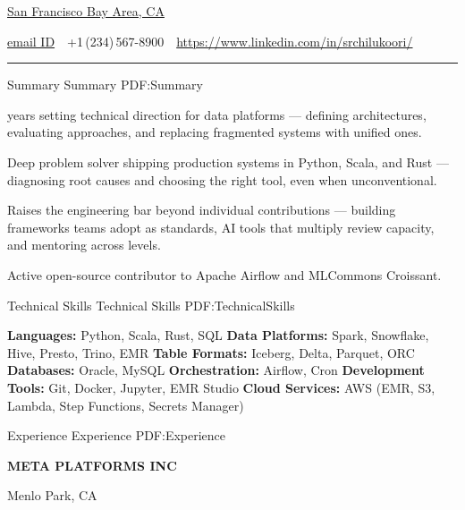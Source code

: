 \documentclass[letterpaper,MMMyyyy,nonstopmode]{simpleresumecv}
\newcommand{\CVAuthor}{Sadha Chilukoori}
\newcommand{\CVWebpage}{https://www.linkedin.com/in/srchilukoori/}
\newcommand{\CompanyName}[1]{{\fontsize{10pt}{12pt}\selectfont\bfseries\MakeUppercase{#1}}}
\begin{document}

\Title{\CVAuthor}

\begin{SubTitle}
\href{https://www.google.com/maps/place/San+Francisco+Bay+Area,+CA/}
{San Francisco Bay Area, CA}
\par
\href{mailto:<email ID>}
{email ID}
\,\SubBulletSymbol\,
+1\,(234)\,567-8900
\,\SubBulletSymbol\,
\href{\CVWebpage}
{\url{\CVWebpage}}
\end{SubTitle}

\Gap
\hrule
\BigGap

\begin{Body}

\Section
{Summary}
{Summary}
{PDF:Summary}

\begingroup

 years setting technical direction for data platforms --- defining architectures, evaluating approaches, and replacing fragmented systems with unified ones.

\Entry Deep problem solver shipping production systems in Python, Scala, and Rust --- diagnosing root causes and choosing the right tool, even when unconventional.

\Entry Raises the engineering bar beyond individual contributions --- building frameworks teams adopt as standards, AI tools that multiply review capacity, and mentoring across levels.

\Entry Active open-source contributor to Apache Airflow and MLCommons Croissant.

\endgroup

\Section
{Technical Skills}
{Technical Skills}
{PDF:TechnicalSkills}

\begingroup

\Entry \textbf{Languages:} Python, Scala, Rust, SQL
\Entry \textbf{Data Platforms:} Spark, Snowflake, Hive, Presto, Trino, EMR
\Entry \textbf{Table Formats:} Iceberg, Delta, Parquet, ORC
\Entry \textbf{Databases:} Oracle, MySQL
\Entry \textbf{Orchestration:} Airflow, Cron
\Entry \textbf{Development Tools:} Git, Docker, Jupyter, EMR Studio
\Entry \textbf{Cloud Services:} AWS (EMR, S3, Lambda, Step Functions, Secrets Manager)

\endgroup


\Section
{Experience}
{Experience}
{PDF:Experience}

\par{}%
\CompanyName{Meta Platforms Inc}
\par Menlo Park, CA


\end{Body}
\end{document}
